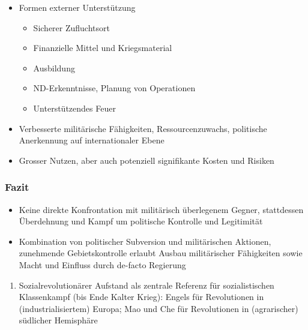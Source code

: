 {}\documentclass[a4paper]{article}
\providecommand{\tightlist}{\setlength{\itemsep}{1mm}\setlength{\parskip}{1mm}}
\begin{document}
\begin{itemize}
	\tightlist
	\item
	      Formen externer Unterstützung

	      \begin{itemize}
		      \tightlist
		      \item
		            Sicherer Zufluchtsort
		      \item
		            Finanzielle Mittel und Kriegsmaterial
		      \item
		            Ausbildung
		      \item
		            ND-Erkenntnisse, Planung von Operationen
		      \item
		            Unterstützendes Feuer
	      \end{itemize}
	\item
	      Verbesserte militärische Fähigkeiten, Ressourcenzuwachs, politische
	      Anerkennung auf internationaler Ebene
	\item
	      Grosser Nutzen, aber auch potenziell signifikante Kosten und Risiken
\end{itemize}

\subsubsection{Fazit}\label{fazit-2}

\begin{itemize}
	\tightlist
	\item
	      Keine direkte Konfrontation mit militärisch überlegenem Gegner,
	      stattdessen Überdehnung und Kampf um politische Kontrolle und
	      Legitimität
	\item
	      Kombination von politischer Subversion und militärischen Aktionen,
	      zunehmende Gebietskontrolle erlaubt Ausbau militärischer Fähigkeiten
	      sowie Macht und Einfluss durch de-facto Regierung
\end{itemize}

\begin{enumerate}
	\def\labelenumi{\arabic{enumi}.}
	\tightlist
	\item
	      Sozialrevolutionärer Aufstand als zentrale Referenz für
	      sozialistischen Klassenkampf (bis Ende Kalter Krieg): Engels für
	      Revolutionen in (industrialisiertem) Europa; Mao und Che für
	      Revolutionen in (agrarischer) südlicher Hemisphäre
\end{enumerate}
\end{document}
